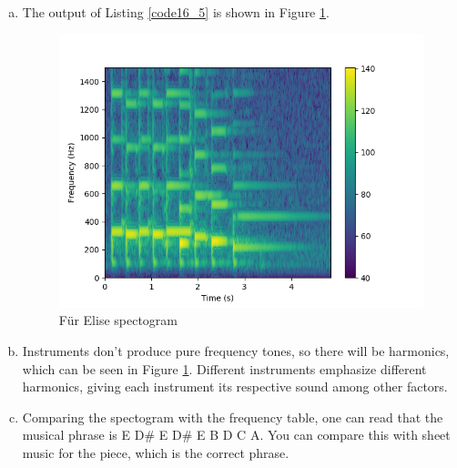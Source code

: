 \begin{enumerate}
\begin{enumerate}[a)]
\item The output of Listing \ref{code16_5} is shown in Figure \ref{fur_elise_spectogram}.
\begin{figure}[h!]
    \centering
    \includegraphics[scale=1.0]{ch17/figures/fur_elise_spectogram.png}
    \caption{Für Elise spectogram}
    \label{fur_elise_spectogram}
\end{figure}

\item Instruments don't produce pure frequency tones, so there will be harmonics, which can be seen in Figure \ref{fur_elise_spectogram}. Different instruments emphasize different harmonics,
giving each instrument its respective sound among other factors. 

\item Comparing the spectogram with the frequency table, one can read that the musical phrase is E D\# E D\# E B D C A. You can compare this with sheet music for the piece, which is the correct phrase. 

\end{enumerate}
\end{enumerate}